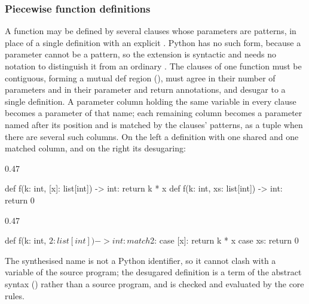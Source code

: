 \subsubsection{Piecewise function definitions}
\label{sec:extension-piecewise}

A function may be defined by several clauses whose parameters are patterns, in place of a single definition
with an explicit . Python has no such form, because a parameter cannot be a pattern, so the
extension is syntactic and needs no notation to distinguish it from an ordinary . The clauses
of one function must be contiguous, forming a mutual def region (), must agree in
their number of parameters and in their parameter and return annotations, and desugar to a single definition.
A parameter column holding the same variable in every clause becomes a parameter of that name; each remaining
column becomes a parameter named after its position and is matched by the clauses' patterns, as a tuple when
there are several such columns. On the left a definition with one shared and one matched column, and on the
right its desugaring:

\begin{listingrow}
\begin{listingcol}{0.47\textwidth}
\begin{python}
def f(k: int, [x]: list[int]) -> int:
    return k * x
def f(k: int, xs: list[int]) -> int:
    return 0
\end{python}
\end{listingcol}
\begin{listingcol}{0.47\textwidth}
\begin{python}
def f(k: int, $2: list[int]) -> int:
    match $2:
        case [x]:
            return k * x
        case xs:
            return 0
\end{python}
\end{listingcol}
\end{listingrow}

\noindent The synthesised name  is not a Python identifier, so it cannot clash with a variable
of the source program; the desugared definition is a term of the abstract syntax () rather
than a source program, and is checked and evaluated by the core rules.
